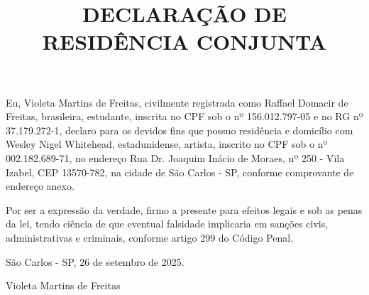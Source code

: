 \documentclass[11pt]{article}
\title{DECLARAÇÃO DE RESIDÊNCIA CONJUNTA}
\author{}
\date{}
\newcommand{\pulinho}{\vspace{.5cm}}
\theoremstyle{definition}
\theoremstyle{definition}
\theoremstyle{definition}
\theoremstyle{definition}
\theoremstyle{definition}
\theoremstyle{definition}
\theoremstyle{definition}
\theoremstyle{definition}
\theoremstyle{definition}
\theoremstyle{definition}
\theoremstyle{definition}
\theoremstyle{definition}
\theoremstyle{definition}
\begin{document}
\maketitle

Eu, Violeta Martins de Freitas, civilmente registrada como Raffael Domacir de Freitas, brasileira, estudante, inscrita no CPF sob o nº 156.012.797-05 e no RG nº 37.179.272-1, declaro para os devidos fins que possuo residência e domicílio com  Wesley Nigel Whitehead, estadunidense, artista, inscrito no CPF sob o nº 002.182.689-71, no endereço Rua Dr. Joaquim Inácio de Moraes, nº 250 - Vila Izabel, CEP 13570-782, na cidade de São Carlos - SP, conforme comprovante de endereço anexo.

Por ser a expressão da verdade, firmo a presente para efeitos legais e sob as penas da lei, tendo ciência de que eventual falsidade implicaria em sanções civis, administrativas e criminais, conforme artigo 299 do Código Penal.

\pulinho

São Carlos - SP, 26 de setembro de 2025.


\pulinho

\pulinho

\pulinho


Violeta Martins de Freitas
\end{document}
